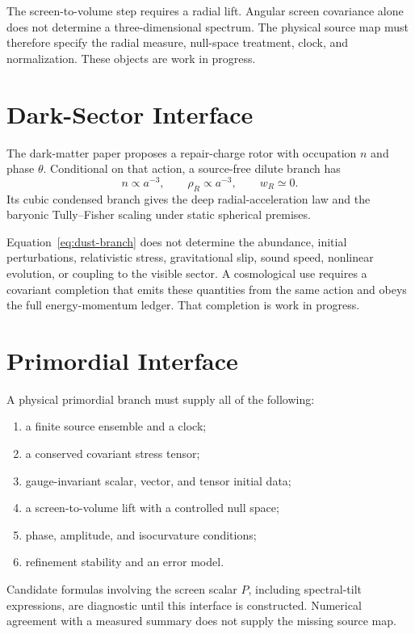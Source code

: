 \documentclass[11pt]{article}
\begin{document}
The screen-to-volume step requires a radial lift. Angular screen covariance
alone does not determine a three-dimensional spectrum. The physical source map
must therefore specify the radial measure, null-space treatment, clock, and
normalization. These objects are work in progress.

\section{Dark-Sector Interface}

The dark-matter paper proposes a repair-charge rotor with occupation \(n\) and
phase \(\theta\). Conditional on that action, a source-free dilute branch has
\begin{equation}
n\propto a^{-3},
\qquad
\rho_R\propto a^{-3},
\qquad
w_R\simeq0.
\label{eq:dust-branch}
\end{equation}
Its cubic condensed branch gives the deep radial-acceleration law and the
baryonic Tully--Fisher scaling under static spherical premises.

Equation~\eqref{eq:dust-branch} does not determine the abundance, initial
perturbations, relativistic stress, gravitational slip, sound speed, nonlinear
evolution, or coupling to the visible sector. A cosmological use requires a
covariant completion that emits these quantities from the same action and
obeys the full energy-momentum ledger. That completion is work in progress.

\section{Primordial Interface}

A physical primordial branch must supply all of the following:
\begin{enumerate}[leftmargin=2em]
\item a finite source ensemble and a clock;
\item a conserved covariant stress tensor;
\item gauge-invariant scalar, vector, and tensor initial data;
\item a screen-to-volume lift with a controlled null space;
\item phase, amplitude, and isocurvature conditions;
\item refinement stability and an error model.
\end{enumerate}

Candidate formulas involving the screen scalar \(P\), including spectral-tilt
expressions, are diagnostic until this interface is constructed. Numerical
agreement with a measured summary does not supply the missing source map.
\end{document}
